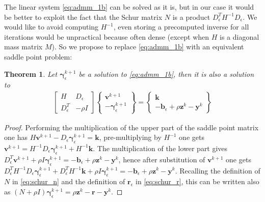\documentclass[final,3p]{elsarticle}
\newcommand{\vect}[1]{\bm{#1}}
\newtheorem{theorem}{Theorem}[section]
\begin{document}

The linear system \eqref{eq:admm_1b} can be solved as it is, but in our case it would be better to exploit the fact that the Schur matrix $N$ is a product $D_\epsilon^T H^{-1} D_\epsilon$. We would like to avoid computing $H^{-1}$, even storing a precomputed inverse for all iterations would be unpractical because often dense (except when $H$ is a diagonal mass matrix $M$). So we propose to replace \eqref{eq:admm_1b} with an equivalent saddle point problem: 

\begin{theorem}
\label{th:schurtokkt}
Let $\vect{\gamma}_\epsilon^{k+1}$ be a solution to \eqref{eq:admm_1b}, then it is also a solution to
%
\begin{subequations}
	\begin{align}
    \begin{bmatrix}
		 H   & D_\epsilon \\
		 D_\epsilon^T & - \rho I
		\end{bmatrix}
		\begin{Bmatrix}
		 \vect{v}^{k+1}   \\
		 -\vect{\gamma}_\epsilon^{k+1} 
		\end{Bmatrix}
		=
		\begin{Bmatrix}
		 \vect{k} \\
		 -\vect{b}_\epsilon + \rho \vect{z}^k -\vect{y}^k 
		\end{Bmatrix}
	\end{align}
	\label{eq:admm_1c}
\end{subequations}
%
\end{theorem}

\begin{proof}
Performing the multiplication of the upper part of the saddle point matrix one has 
$H \vect{v}^{k+1} - D_\epsilon \vect{\gamma}_\epsilon^{k+1} = \vect{k}$,
pre-multiplying by $H^{-1}$ one gets 
$\vect{v}^{k+1} = H^{-1} D_\epsilon \vect{\gamma}_\epsilon^{k+1} + H^{-1} \vect{k}$. 
The multiplication of the lower part gives 
$D_\epsilon^T \vect{v}^{k+1} + \rho I \vect{\gamma}_\epsilon^{k+1} = -\vect{b}_\epsilon + \rho \vect{z}^k -\vect{y}^k $, 
hence after substitution of $\vect{v}^{k+1}$ one gets
$D_\epsilon^T H^{-1} D_\epsilon \vect{\gamma}_\epsilon^{k+1}  + D_\epsilon^T H^{-1} \vect{k} + \rho I \vect{\gamma}_\epsilon^{k+1} = -\vect{b}_\epsilon + \rho \vect{z}^k -\vect{y}^k$. 
Recalling the definition of $N$ in \eqref{eq:schur_n} and the definition of $\vect{r}_\epsilon$ in \eqref{eq:schur_r}, this can be written also as 
$(N + \rho I) \vect{\gamma}_\epsilon^{k+1} =  \rho \vect{z}^k - \vect{r} - \vect{y}^k$. 
\end{proof}
\end{document}
